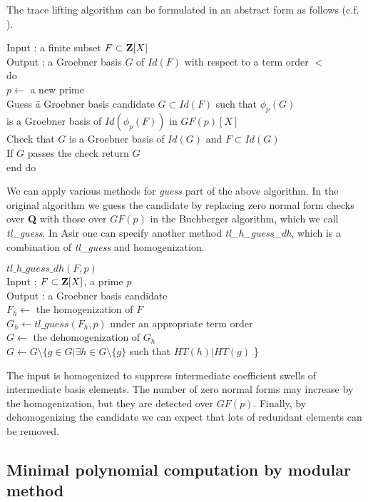 \documentclass[runningheads]{cl2emult}
\begin{document}
The trace lifting algorithm can be
formulated in an abstract form as follows (c.f. \cite{noro:FPARA}).
\begin{tabbing}
Input : a finite subset $F \subset {\bf Z}[X]$\\
Output : a Groebner basis $G$ of $Id(F)$ with respect to a term order $<$\\
do \= \\
\> $p \leftarrow$ a new prime\\
\>Guess \= a Groebner basis candidate $G \subset Id(F)$ 
such that $\phi_p(G)$ \\
\>\> is a Groebner basis of $Id(\phi_p(F))$ in ${GF(p)}[X]$\\
\>Check that $G$ is a Groebner basis of $Id(G)$ and $F \subset Id(G)$\\
\>If $G$ passes the check return $G$\\
end do
\end{tabbing}
We can apply various methods for {\it guess} part of the above
algorithm.  In the original algorithm we guess the candidate by
replacing zero normal form checks over {\bf Q} with those over $GF(p)$
in the Buchberger algorithm, which we call {\it tl\_guess}. In Asir
one can specify another method {\it tl\_h\_guess\_dh}, which is a
combination of {\it tl\_guess} and homogenization.
\begin{tabbing}
$tl\_h\_guess\_dh(F,p)$\\
Input : $F\subset {\bf Z}[X]$, a prime $p$\\
Output : a Groebner basis candidate\\
$F_h \leftarrow$ the homogenization of $F$\\
$G_h \leftarrow tl\_guess(F_h,p)$ under an appropriate term order\\
$G \leftarrow$ the dehomogenization of $G_h$\\
$G \leftarrow G \setminus \{g \in G| \exists h \in G \setminus \{g\}$
such that $HT(h)|HT(g)$ \}
\end{tabbing}
The input is homogenized to suppress intermediate coefficient swells
of intermediate basis elements.  The number of zero normal forms may
increase by the homogenization, but they are detected over
$GF(p)$. Finally, by dehomogenizing the candidate we can expect that
lots of redundant elements can be removed.

\subsection{Minimal polynomial computation by modular method}
\end{document}

